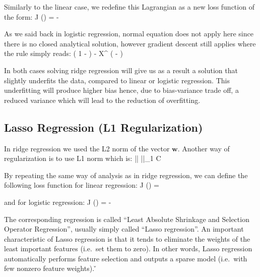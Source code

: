 Similarly to the linear case, we redefine this Lagrangian as a new loss function of the form:
\bse
J () = -  
\ese

As we said back in logistic regression, normal equation does not apply here since there is no closed analytical
solution, however gradient descent still applies where the rule simply reads:
\bse
{} \coloneqq \Big( 1 -  \Big)  -  X^{\intercal}
\Big( - \Big)
\ese

In both cases solving ridge regression will give us as a result a solution that slightly underfits the data, compared
to linear or logistic regression. This underfitting will produce higher bias hence, due to bias-variance trade off, a
reduced variance which will lead to the reduction of overfitting.

\subsection{Lasso Regression (L1 Regularization)}

In ridge regression we used the L2 norm of the vector $\boldsymbol{w}$. Another way of regularization is to use L1
norm which is:
\bse
||  ||_1 \leq C
\ese

By repeating the same way of analysis as in ridge regression, we can define the following loss function for linear
regression:
\bse
J () =  
\ese

and for logistic regression:
\bse
J () = -  
\ese

The corresponding regression is called ``Least Absolute Shrinkage and Selection Operator Regression'', usually
simply called ``Lasso regression''. An important characteristic of Lasso regression is that it tends to eliminate
the weights of the least important features (i.e.\ set them to zero). In other words, Lasso regression automatically
performs feature selection and outputs a sparse model (i.e.\ with few nonzero feature weights). \v

